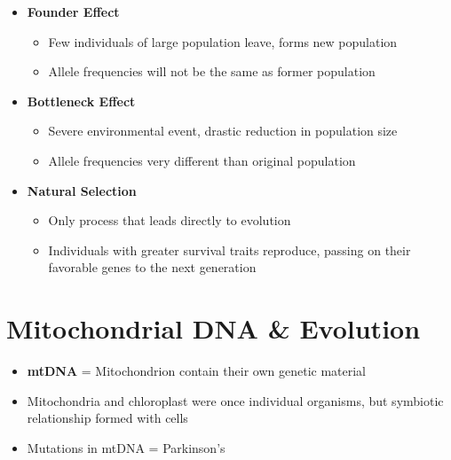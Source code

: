 \documentclass[a4paper,12pt]{article}
\begin{document}
\begin{itemize}
{\begin{itemize}
{\begin{itemize}
                        \end{itemize}
                    }
                \item{
                        \textbf{Founder Effect}
                        \begin{itemize}
                            \item{Few individuals of large population leave, forms new population}
                            \item{Allele frequencies will not be the same as former population}
                        \end{itemize}
                    }
                \item{
                        \textbf{Bottleneck Effect}
                        \begin{itemize}
                            \item{Severe environmental event, drastic reduction in population size}
                            \item{Allele frequencies very different than original population}
                        \end{itemize}
                    }
                \item{
                        \textbf{Natural Selection}
                        \begin{itemize}
                            \item{Only process that leads directly to evolution}
                            \item{Individuals with greater survival traits reproduce, passing on their favorable genes to the next generation}
                        \end{itemize}
                    }
            \end{itemize}
        }
\end{itemize}

\pagebreak

\section{Mitochondrial DNA \& Evolution}
\begin{itemize}
    \item{\textbf{mtDNA} = Mitochondrion contain their own genetic material}
    \item{Mitochondria and chloroplast were once individual organisms, but symbiotic relationship formed with cells}
    \item{Mutations in mtDNA = Parkinson's}
\end{itemize}
\end{document}
